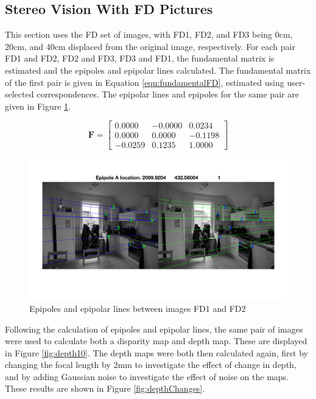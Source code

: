 \documentclass[a4paper, 10pt, conference]{ieeeconf}
\begin{document}
\subsection{Stereo Vision With FD Pictures}


This section uses the FD set of images, with FD1, FD2, and FD3 being 0cm, 20cm, and 40cm displaced from the original image, respectively. For each pair FD1 and FD2, FD2 and FD3, FD3 and FD1, the fundamental matrix is estimated and the epipoles and epipolar lines calculated. The fundamental matrix of the first pair is given in Equation \ref{eqn:fundamentalFD}, estimated using user-selected correspondences. The epipolar lines and epipoles for the same pair are given in Figure \ref{fig:fdEpipoles}.

\begin{equation} \label{eqn:fundamentalFD}
\textbf{F} = \begin{bmatrix}
     0.0000 & -0.0000 &  0.0234 \\
     0.0000 &  0.0000 & -0.1198 \\
    -0.0259 &  0.1235 &  1.0000
\end{bmatrix}
\end{equation}

\begin{figure}[!ht]
  \centering
  \includegraphics[width=\linewidth]{pic/q2_2_ab_A_0}
  \caption{Epipoles and epipolar lines between images FD1 and FD2}
  \label{fig:fdEpipoles}
\end{figure}

Following the calculation of epipoles and epipolar lines, the same pair of images were used to calculate both a disparity map and depth map. These are displayed in Figure \ref{fig:depth10}. The depth maps were both then calculated again, first by changing the focal length by 2mm to investigate the effect of change in depth, and by adding Gaussian noise to investigate the effect of noise on the maps. These results are shown in Figure \ref{fig:depthChanges}.
\end{document}
